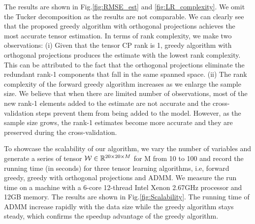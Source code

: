 The results are shown in Fig.\ref{fig:RMSE_est} and \ref{fig:LR_complexity}. We omit the Tucker decomposition as the results are not comparable. We can clearly see that the proposed greedy algorithm with orthogonal projections achieves the most accurate tensor estimation. In terms of rank complexity, we make two observations: (i) Given that the tensor CP rank is 1, greedy algorithm with orthogonal projections produces the estimate with the lowest rank complexity. This can be attributed to the fact that the orthogonal projections eliminate the redundant rank-1 components that fall in the same spanned space. (ii) The rank complexity of the forward greedy algorithm increases as we enlarge the sample size. We believe that  when there are limited number of observations, most of the new rank-1 elements added to the estimate are not accurate and the cross-validation steps prevent them from being added to the model. However, as the sample size grows, the rank-1 estimates become more accurate and they are preserved during the cross-validation.

To showcase the scalability of our algorithm, we vary the number of variables and generate a series of tensor ${\mathcal W} \in \mathbb{R}^{20\times 20 \times M}$ for M from 10 to 100 and record the running time (in seconds) for three tensor learning algorithms, i.e, forward greedy, greedy with orthogonal projections and ADMM. We measure the run time on a machine with a 6-core 12-thread Intel Xenon 2.67GHz processor and  12GB memory. The results are shown in 
Fig.\ref{fig:Scalability}. The running time of ADMM increase rapidly with the data size while the greedy algorithm stays steady,  which confirms the speedup advantage of the greedy algorithm. 
